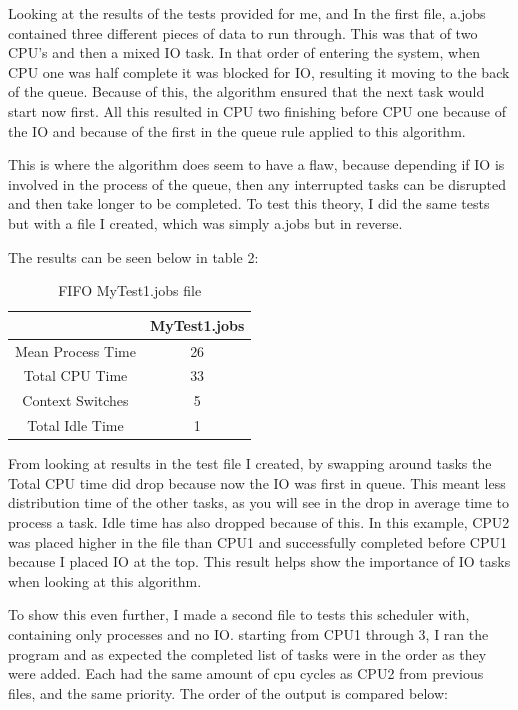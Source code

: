 \documentclass{sig-alternate}
\begin{document}
Looking at the results of the tests provided for me, and In the first file,
a.jobs contained three different pieces of data to run through. This was that of
two CPU's and then a mixed IO task. In that order of entering the system, when
CPU one was half complete it was blocked for IO, resulting it moving to the back
of the queue. Because of this, the algorithm ensured that the next task would
start now first. All this resulted in CPU two finishing before CPU one because
of the IO and because of the first in the queue rule applied to this algorithm. 

This is where the algorithm does seem to have a flaw, because depending if IO is
involved in the process of the queue, then any interrupted tasks can be disrupted
and then take longer to be completed. To test this theory, I did the same tests
but with a file I created, which was simply a.jobs but in reverse.

 The results can be seen below in table 2:
\vspace{18mm}
\begin{table}[!h]
\centering
\caption{FIFO MyTest1.jobs file}
\begin{tabular}{|c|c|} \hline
&MyTest1.jobs\\ \hline
Mean Process Time&26\\ \hline
Total CPU Time&33\\ \hline
Context Switches&5\\ \hline
Total Idle Time&1\\ \hline
\end{tabular}
\end{table}

From looking at results in the test file I created, by swapping around tasks the
Total CPU time did drop because now the IO was first in queue. This meant less
distribution time of the other tasks, as you will see in the drop in average time
to process a task. Idle time has also dropped because of this. In this example,
CPU2 was placed higher in the file than CPU1 and successfully completed before
CPU1 because I placed IO at the top. This result helps show the importance of IO
tasks when looking at this algorithm. 

To show this even further, I made a second file to tests this scheduler with,
containing only processes and no IO. starting from CPU1 through 3, I ran the
program and as expected the completed list of tasks were in the order as they
were added. Each had the same amount of cpu cycles as CPU2 from previous files,
and the same priority. The order of the output is compared below:
\end{document}
